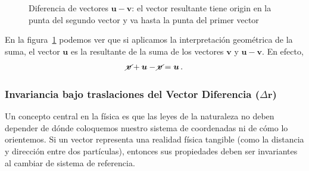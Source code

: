 \documentclass[11pt,a4paper]{book}
\begin{document}
\begin{figure}[H]
    \centering

\newcommand{\xorg}{0}
\newcommand{\yorg}{0}

    
    \caption{Diferencia de vectores $\boldsymbol{u}-\boldsymbol{v}$: el vector resultante tiene origin en la punta del segundo vector y va hasta la punta del primer vector}
    \label{fig:difvecuv}
\end{figure}

En la figura~\ref{fig:difvecuv} podemos ver que si aplicamos la interpretación geométrica de la suma, el vector $\boldsymbol{u}$ es la resultante de la suma de los vectores $\boldsymbol{v}$ y $\boldsymbol{u}-\boldsymbol{v}$. En efecto,
\begin{align*}
    \cancel{\boldsymbol{v}}+\boldsymbol{u}-\cancel{\boldsymbol{v}}
    =\boldsymbol{u}\,.
\end{align*}


\subsubsection{Invariancia bajo traslaciones del Vector Diferencia ($\Delta\boldsymbol{r}$)}

Un concepto central en la física es que las leyes de la naturaleza no deben depender de dónde coloquemos nuestro sistema de coordenadas ni de cómo lo orientemos. Si un vector representa una realidad física tangible (como la distancia y dirección entre dos partículas), entonces sus propiedades deben ser invariantes al cambiar de sistema de referencia.
\end{document}
